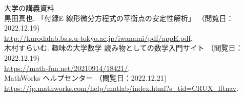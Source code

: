 \documentclass[11pt]{jsarticle}
\begin{document}
\clearpage
\begin{thebibliography}{99}
 大学の講義資料\\
 黒田真也. 「付録E 線形微分方程式の平衡点の安定性解析」 （閲覧日：2022.12.19)\\
 \url{http://kurodalab.bs.s.u-tokyo.ac.jp/iwanami/pdf/appE.pdf}.\\
 木村すらいむ. 趣味の大学数学 読み物としての数学入門サイト （閲覧日：2022.12.19)\\
 \url{https://math-fun.net/20210914/18421/}.\\
 MathWorks ヘルプセンター （閲覧日：2022.12.21)\\
 \url{https://jp.mathworks.com/help/matlab/index.html?s_tid=CRUX_lftnav}.\\
\end{thebibliography}
\end{document}
